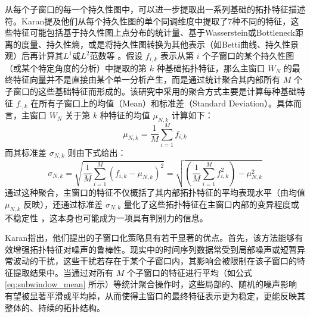 从每个子窗口的每一个持久性图中，可以进一步提取出一系列基础的拓扑特征描述符。Karan提及他们从每个持久性图的单个同调维度中提取了7种不同的特征，这些特征可能包括基于持久性图上点分布的统计量、基于Wasserstein或Bottleneck距离的度量、持久性熵，或是将持久性图转换为其他表示（如Betti曲线、持久性景观）后再计算其$L^1$或$L^2$范数等 。假设 $f_{i,k}$ 表示从第 $i$ 个子窗口的某个持久性图（或某个特定角度的分析）中提取的第 $k$ 种基础拓扑特征，那么主窗口 $W_N$ 的最终特征向量并不是直接由某个单一分析产生，而是通过统计聚合其内部所有 $M$ 个子窗口的这些基础特征而形成的。该研究中采用的聚合方式主要是计算每种基础特征 $f_{\cdot,k}$ 在所有子窗口上的均值（Mean）和标准差（Standard Deviation）。具体而言，主窗口 $W_N$ 关于第 $k$ 种特征的均值 $\mu_{N,k}$ 计算如下：
\begin{equation}
    \mu_{N,k} = \frac{1}{M} \sum_{i=1}^{M} f_{i,k}
    \label{eq:subwindow_mean}
\end{equation}
而其标准差 $\sigma_{N,k}$ 则由下式给出：
\begin{equation}
    \sigma_{N,k} = \sqrt{\frac{1}{M}\sum_{i=1}^{M}(f_{i,k} - \mu_{N,k})^2} = \sqrt{\left(\frac{1}{M}\sum_{i=1}^{M}f_{i,k}^2\right) - \mu_{N,k}^2}
    \label{eq:subwindow_std}
\end{equation}
通过这种聚合，主窗口的特征不仅概括了其内部拓扑特征的平均表现水平（由均值 $\mu_{N,k}$ 反映），还通过标准差 $\sigma_{N,k}$ 量化了这些拓扑特征在主窗口内部的变异程度或不稳定性 ，这本身也可能成为一项具有判别力的信息。

Karan指出，他们提出的子窗口化策略具有若干显著的优点。首先，该方法能够有效增强拓扑特征对噪声的鲁棒性。现实中的时间序列数据常受到局部噪声或短暂异常波动的干扰，这些干扰若存在于某个子窗口内，其影响会被限制在该子窗口的特征提取结果中。当通过对所有 $M$ 个子窗口的特征进行平均（如公式 \ref{eq:subwindow_mean} 所示）等统计聚合操作时，这些局部的、随机的噪声影响有望被显著平滑或平均掉，从而使得主窗口的最终特征表示更为稳定，更能反映其整体的、持续的拓扑结构。

